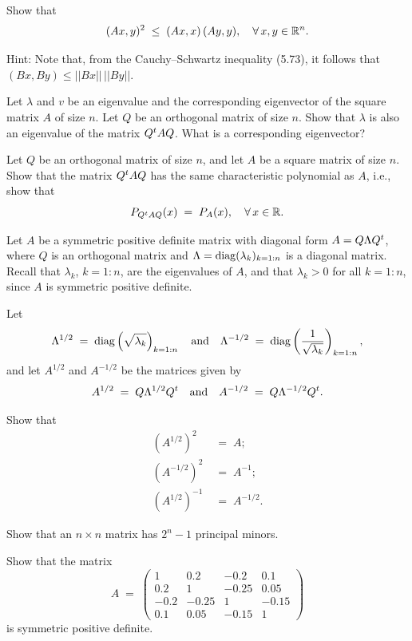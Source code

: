 \begin{exercises}
\begin{subparts}
\item Show that
\begin{equation}
(Ax,y)^2 \;\leq\; (Ax,x)\,(Ay,y), \quad \forall\, x,y \in \mathbb{R}^n.
\end{equation}

\noindent Hint: Note that, from the Cauchy--Schwartz inequality (5.73), it follows
that $(Bx,By) \leq ||Bx||\, ||By||$.
\end{subparts}

\item Let $\lambda$ and $v$ be an eigenvalue and the corresponding eigenvector of the
square matrix $A$ of size $n$. Let $Q$ be an orthogonal matrix of size $n$. Show that
$\lambda$ is also an eigenvalue of the matrix $Q^{t} AQ$. What is a corresponding
eigenvector?

\item Let $Q$ be an orthogonal matrix of size $n$, and let $A$ be a square matrix of
size $n$. Show that the matrix $Q^{t} AQ$ has the same characteristic polynomial as
$A$, i.e., show that
\[
P_{Q^{t} AQ}(x) \;=\; P_A(x), \quad \forall\, x \in \mathbb{R}.
\]

\item Let $A$ be a symmetric positive definite matrix with diagonal form
$A = Q\Lambda Q^{t}$, where $Q$ is an orthogonal matrix and
$\Lambda = \operatorname{diag}(\lambda_k)_{k=1:n}$ is a diagonal matrix. Recall that $\lambda_k$,
$k = 1:n$, are the eigenvalues of $A$, and that $\lambda_k > 0$ for all $k = 1:n$,
since $A$ is symmetric positive definite.

Let
\[
\Lambda^{1/2} \;=\; \operatorname{diag}\left(\sqrt{\lambda_k}\right)_{k=1:n} \quad \text{and} \quad
\Lambda^{-1/2} \;=\; \operatorname{diag}\left(\frac{1}{\sqrt{\lambda_k}}\right)_{k=1:n},
\]
and let $A^{1/2}$ and $A^{-1/2}$ be the matrices given by
\[
A^{1/2} \;=\; Q\Lambda^{1/2}Q^{t} \quad \text{and} \quad
A^{-1/2} \;=\; Q\Lambda^{-1/2}Q^{t}.
\]

Show that
\begin{align*}
\left(A^{1/2}\right)^2 &\;=\; A;\\
\left(A^{-1/2}\right)^2 &\;=\; A^{-1};\\
\left(A^{1/2}\right)^{-1} &\;=\; A^{-1/2}.
\end{align*}

\item Show that an $n \times n$ matrix has $2^n - 1$ principal minors.

\item Show that the matrix
\[
A \;=\;
\begin{pmatrix}
1 & 0.2 & -0.2 & 0.1\\
0.2 & 1 & -0.25 & 0.05\\
-0.2 & -0.25 & 1 & -0.15\\
0.1 & 0.05 & -0.15 & 1
\end{pmatrix}
\]
is symmetric positive definite.


\end{exercises}
